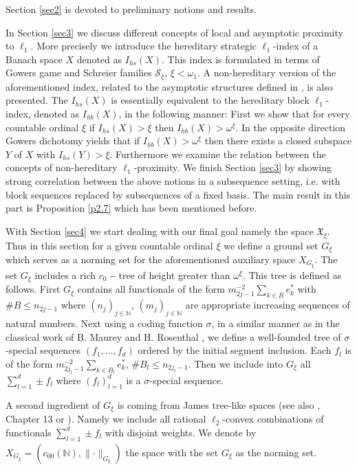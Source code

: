 \documentclass[a4paper]{amsart}
\theoremstyle{plain}
\newcommand{\N}{\mathbb{N}}
\newcommand{\mc}{\mathcal}
\newcommand{\norm}[1][\cdot]{\lVert #1\rVert}
\begin{document}
Section \ref{sec2} is devoted to preliminary notions and results.

In Section \ref{sec3} we discuss different concepts of
local and asymptotic proximity to $\ell_{1}$.
More  precisely we introduce the hereditary strategic
$\ell_{1}$-index of a Banach space $X$ denoted as $I_{hs}(X)$.
This index is formulated in terms of Gowers  game and Schreier
families  $\mc{S}_{\xi}$, $\xi<\omega_{1}$.
A non-hereditary version of the aforementioned index, related to the asymptotic structures
defined in \cite{MMT}, is also presented.
The  $I_{hs}(X)$ is essentially equivalent  to the hereditary block
 $\ell_{1}$-index, denoted as $I_{hb}(X)$,
in the following manner:  First we show  that for every countable ordinal $\xi$ if $I_{hs}(X)>\xi$ then $I_{hb}(X)>\omega^{\xi}$. In the opposite direction Gowers dichotomy \cite{G} yields that if  $I_{hb}(X)>\omega^{\xi}$ then there exists a closed subspace $Y$ of $X$ with $I_{hs}(Y)>\xi.
$
Furthermore we  examine the relation between the concepts of non-hereditary $\ell_{1}$-proximity.
We finish Section \ref{sec3} by showing strong correlation between the above notions in
a subsequence setting, i.e. with block sequences replaced by subsequences of a fixed basis. The main result in this part is Proposition \ref{p2.7} which has been mentioned before.


With Section \ref{sec4}  we start dealing with our final goal namely the space
$\mathfrak{X}_{\xi}$. Thus in this section for a given countable ordinal $\xi$ we define
a ground set $G_{\xi}$ which serves as a norming set for the  aforementioned auxiliary
space $X_{G_{\xi}}$. The set $G_{\xi}$ includes a rich $c_0-$tree of height greater than
$\omega^{\xi}$. This tree is defined as follows.   First $G_{\xi}$ contains all
functionals of the form $m_{2j-1}^{-2}\sum_{k\in B}e_{k}^{*}$ with $\# B \leq n_{2j-1}$
where $(n_j)_{j\in\N}$, $(m_{j})_{j\in\N}$ are  appropriate increasing sequences of
natural numbers. Next using a coding function $\sigma$, in a similar manner as in the
classical work of B. Maurey and H. Rosenthal  \cite{MR}, we define a well-founded tree of
$\sigma$-special sequences $(f_{1},\dots,f_{d})$ ordered by the initial segment
inclusion. Each $f_{l}$ is of the form  $m_{2j_{l}-1}^{-2}\sum_{k\in B_{l}}e_{k}^{*}$,
$\#B_{l}\leq n_{2j_{l}-1}$. Then we include into $G_{\xi}$  all $\sum_{l=1}^{d}\pm f_{l}$
where $(f_{l})_{l=1}^{d}$ is a $\sigma$-special sequence.

A second ingredient of $G_{\xi}$ is  coming from James tree-like spaces \cite{Ja} (see
also \cite{Kal}, Chapter 13 or \cite{AAT}). Namely we include all rational
$\ell_2$-convex combinations of  functionals $\sum_{l=1}^{d}\pm f_{l}$ with disjoint
weights.  We denote by $X_{G_{\xi}}=\overline{( c_{00}(\N),\norm_{G_{\xi}})}$
the space with the set $G_{\xi}$ as the norming set.
\end{document}
